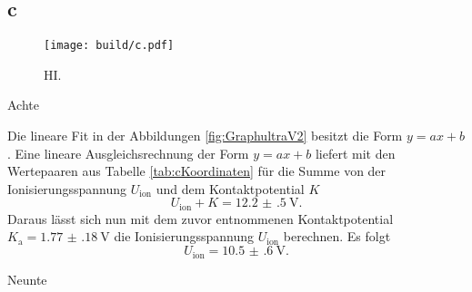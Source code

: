 \subsection{c}
\begin{figure}
	\centering
	\caption{HI.}
	\texttt{[image: build/c.pdf]}
	\label{fig:GraphSelektiv}
\end{figure}
\begin{table}
	\caption{Achte}
	\centering
	
\end{table}
Die lineare Fit in der Abbildungen \ref{fig:GraphultraV2} besitzt die Form $y=a x + b$. Eine lineare Ausgleichsrechnung der Form $y=a x+b$ liefert mit den Wertepaaren aus Tabelle \ref{tab:cKoordinaten} für die Summe von der Ionisierungsspannung $U_\text{ion}$ und dem Kontaktpotential $K$
\begin{displaymath}
	U_\text{ion}+K=\SI{12.2(5)}{\volt}\text{.}
\end{displaymath}
Daraus lässt sich nun mit dem zuvor entnommenen Kontaktpotential $K_\text{a}=\SI{1.77(18)}{\volt}$ die Ionisierungsspannung $U_\text{ion}$ berechnen. Es folgt
\begin{displaymath}
U_\text{ion}=\SI{10.5(6)}{\volt}\text{.}
\end{displaymath}

\begin{table}
	\caption{Neunte}
	\centering
	
\end{table}


